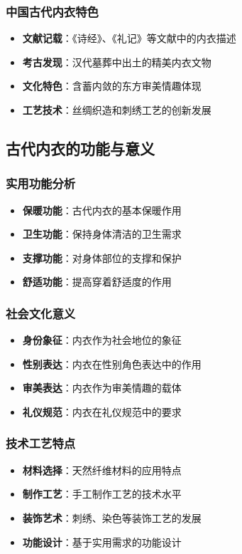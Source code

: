 \documentclass[12pt,UTF8]{ctexbook}
\begin{document}
\subsubsection{中国古代内衣特色}
\begin{itemize}[leftmargin=2cm]
	\item \textbf{文献记载}：《诗经》、《礼记》等文献中的内衣描述
	\item \textbf{考古发现}：汉代墓葬中出土的精美内衣文物
	\item \textbf{文化特色}：含蓄内敛的东方审美情趣体现
	\item \textbf{工艺技术}：丝绸织造和刺绣工艺的创新发展
\end{itemize}

\subsection{古代内衣的功能与意义}
\subsubsection{实用功能分析}
\begin{itemize}[leftmargin=2cm]
	\item \textbf{保暖功能}：古代内衣的基本保暖作用
	\item \textbf{卫生功能}：保持身体清洁的卫生需求
	\item \textbf{支撑功能}：对身体部位的支撑和保护
	\item \textbf{舒适功能}：提高穿着舒适度的作用
\end{itemize}

\subsubsection{社会文化意义}
\begin{itemize}[leftmargin=2cm]
	\item \textbf{身份象征}：内衣作为社会地位的象征
	\item \textbf{性别表达}：内衣在性别角色表达中的作用
	\item \textbf{审美表达}：内衣作为审美情趣的载体
	\item \textbf{礼仪规范}：内衣在礼仪规范中的要求
\end{itemize}

\subsubsection{技术工艺特点}
\begin{itemize}[leftmargin=2cm]
	\item \textbf{材料选择}：天然纤维材料的应用特点
	\item \textbf{制作工艺}：手工制作工艺的技术水平
	\item \textbf{装饰艺术}：刺绣、染色等装饰工艺的发展
	\item \textbf{功能设计}：基于实用需求的功能设计
\end{itemize}
\end{document}
